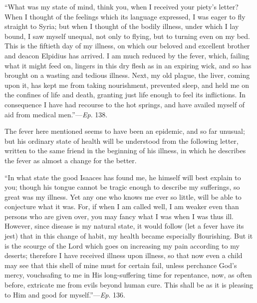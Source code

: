 ``What was my state of mind, think you, when I received your
piety's letter? When I thought of the feelings
which its language expressed, I was eager to fly straight to Syria;
but when I thought of the bodily illness, under which I lay bound, I
saw myself unequal, not only to flying, but to turning even on my bed.
This is the fiftieth day of my illness, on which our beloved and
excellent brother and deacon Elpidius has arrived. I am much reduced
by the fever, which, failing what it might feed on, lingers in this
dry flesh as in an expiring wick, and so has brought on a wasting and
tedious illness. Next, my old plague, the liver, coming upon it, has
kept me from taking nourishment, prevented sleep, and held me on the
confines of life and death, granting just life enough to feel its
inflictions. In consequence I have had recourse to the hot springs,
and have availed myself of aid from medical men.''—\emph{Ep}.
138.

The fever here mentioned seems to have been an epidemic, and so far
unusual; but his ordinary state of health will be understood from the
following letter, written to the same friend in the beginning of his
illness, in which he describes the fever as almost a change for the
better.

``In what state the good Isaaces has found me, he himself will
best explain to you; though his tongue cannot be tragic enough to
describe my sufferings, so great was my illness. Yet any one who knows
me ever so little, will be able to conjecture what it was. For, if
when I am called well, I am weaker even than persons who are given
over, you may fancy what I was when I was thus ill. However, since
disease is my natural state, it would follow (let a fever have its
jest) that in this change of habit, my health became especially
flourishing. But it is the scourge of the Lord which goes on
increasing my pain according to my deserts; therefore I have received
illness upon illness, so that now even a child may see that this shell
of mine must for certain fail, unless perchance God's mercy,
vouchsafing to me in His long-suffering time for repentance, now, as
often before, extricate me from evils beyond human cure. This shall be
as it is pleasing to Him and good for myself.''—\emph{Ep}. 136.


